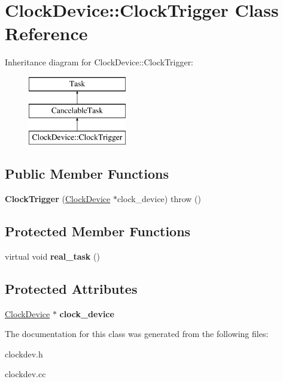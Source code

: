 \hypertarget{classClockDevice_1_1ClockTrigger}{
\section{ClockDevice::ClockTrigger Class Reference}
\label{classClockDevice_1_1ClockTrigger}
}
Inheritance diagram for ClockDevice::ClockTrigger:\begin{figure}[H]
\begin{center}
\leavevmode
\includegraphics[height=3cm]{classClockDevice_1_1ClockTrigger}
\end{center}
\end{figure}
\subsection*{Public Member Functions}
\begin{DoxyCompactItemize}
\item 
\hypertarget{classClockDevice_1_1ClockTrigger_ab6f6e2ba478264425a68a0a8383e660a}{
{\bfseries ClockTrigger} (\hyperlink{classClockDevice}{ClockDevice} $\ast$clock\_\-device)  throw ()}
\label{classClockDevice_1_1ClockTrigger_ab6f6e2ba478264425a68a0a8383e660a}

\end{DoxyCompactItemize}
\subsection*{Protected Member Functions}
\begin{DoxyCompactItemize}
\item 
\hypertarget{classClockDevice_1_1ClockTrigger_af084d7bc8f88985fad96e49fd19f77bd}{
virtual void {\bfseries real\_\-task} ()}
\label{classClockDevice_1_1ClockTrigger_af084d7bc8f88985fad96e49fd19f77bd}

\end{DoxyCompactItemize}
\subsection*{Protected Attributes}
\begin{DoxyCompactItemize}
\item 
\hypertarget{classClockDevice_1_1ClockTrigger_ab7c5345ceeece045bebe2b40b4efdd96}{
\hyperlink{classClockDevice}{ClockDevice} $\ast$ {\bfseries clock\_\-device}}
\label{classClockDevice_1_1ClockTrigger_ab7c5345ceeece045bebe2b40b4efdd96}

\end{DoxyCompactItemize}


The documentation for this class was generated from the following files:\begin{DoxyCompactItemize}
\item 
clockdev.h\item 
clockdev.cc\end{DoxyCompactItemize}
